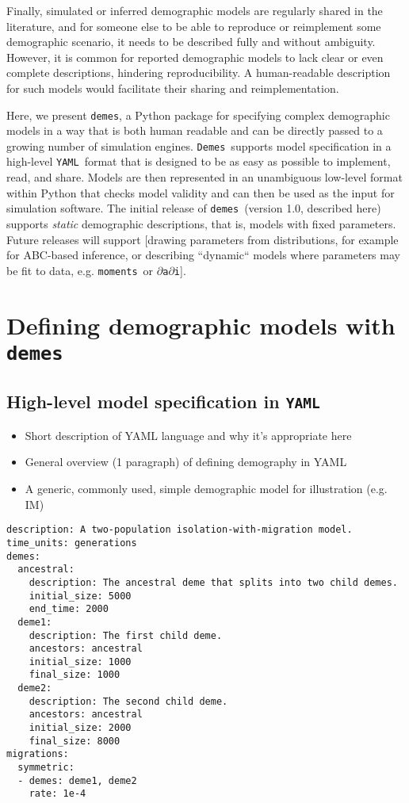 \documentclass[11pt]{article}
\newenvironment{code}{\captionsetup{type=listing}\centering}{}
\newcommand{\demes}[0]{\texttt{demes}}
\newcommand{\Demes}[0]{\texttt{Demes}}
\newcommand{\YAML}[0]{\texttt{YAML}}
\newcommand{\moments}[0]{\texttt{moments}}
\newcommand{\dadi}[0]{\texttt{$\partial$a$\partial$i}}
\begin{document}
Finally, simulated or inferred demographic models are regularly shared in the
literature, and for someone else to be able to reproduce or reimplement some
demographic scenario, it needs to be described fully and without ambiguity. However,
it is common for reported demographic models to lack clear or even complete
descriptions, hindering reproducibility. A human-readable description for
such models would facilitate their sharing and reimplementation.

Here, we present \demes, a Python package for specifying complex demographic models
in a way that is both human readable and can be directly passed to a growing
number of simulation engines. \Demes\ supports model specification in a high-level
\YAML\ format \citep{ben2009yaml}
that is designed to be as easy as possible to implement, read, and
share. Models are then represented in an unambiguous low-level format within Python
that checks model validity and can then be used as the input for simulation software.
The initial release of \demes\ (version 1.0, described here) supports \emph{static}
demographic descriptions, that is, models with fixed parameters. Future releases
will support [drawing parameters from distributions, for example for ABC-based
inference, or describing ``dynamic`` models where parameters may be fit to data,
e.g. \moments\ or \dadi].

\section*{Defining demographic models with \demes}

\subsection*{High-level model specification in \YAML}

\begin{itemize}
\item Short description of YAML language and why it's appropriate here
\item General overview (1 paragraph) of defining demography in YAML
\item A generic, commonly used, simple demographic model for illustration (e.g. IM)
\end{itemize}

\begin{code}
\label{code:im_model}
\begin{verbatim}
description: A two-population isolation-with-migration model.
time_units: generations
demes:
  ancestral:
    description: The ancestral deme that splits into two child demes.
    initial_size: 5000
    end_time: 2000
  deme1:
    description: The first child deme.
    ancestors: ancestral
    initial_size: 1000
    final_size: 1000
  deme2:
    description: The second child deme.
    ancestors: ancestral
    initial_size: 2000
    final_size: 8000
migrations:
  symmetric:
  - demes: deme1, deme2
    rate: 1e-4
\end{verbatim}
\end{code}
\end{document}
